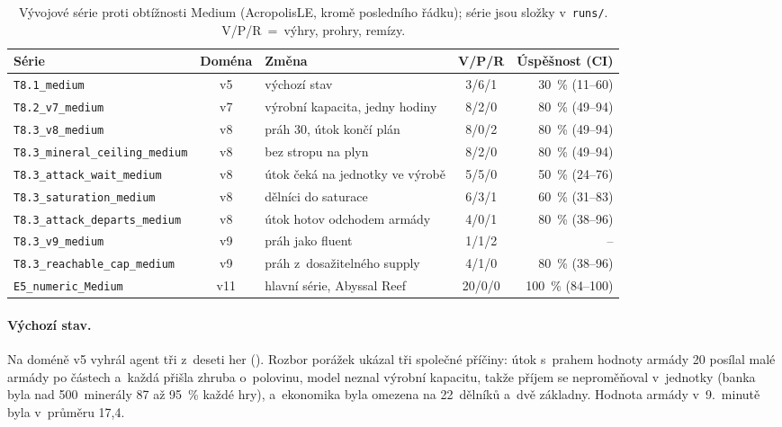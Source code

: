\begin{table}[ht]
	\centering
	\caption[Vývojové série proti obtížnosti Medium.]{Vývojové série proti obtížnosti Medium (AcropolisLE, kromě posledního řádku); série jsou složky v~\texttt{runs/}. V/P/R~=~výhry, prohry, remízy.}
	\label{tab:iterace}
	\footnotesize
	\begin{tabularx}{\textwidth}{@{} >{\raggedright\arraybackslash}p{4.5cm} c >{\raggedright\arraybackslash}X c r @{}}
		\toprule
		\textbf{Série} & \textbf{Doména} & \textbf{Změna} & \textbf{V/P/R} & \textbf{Úspěšnost (CI)} \\
		\midrule
		\nolinkurl{T8.1_medium} & v5 & výchozí stav & 3/6/1 & 30~\% (11--60) \\
		\nolinkurl{T8.2_v7_medium} & v7 & výrobní kapacita, jedny hodiny & 8/2/0 & 80~\% (49--94) \\
		\nolinkurl{T8.3_v8_medium} & v8 & práh 30, útok končí plán & 8/0/2 & 80~\% (49--94) \\
		\nolinkurl{T8.3_mineral_ceiling_medium} & v8 & bez stropu na plyn & 8/2/0 & 80~\% (49--94) \\
		\nolinkurl{T8.3_attack_wait_medium} & v8 & útok čeká na jednotky ve výrobě & 5/5/0 & 50~\% (24--76) \\
		\nolinkurl{T8.3_saturation_medium} & v8 & dělníci do saturace & 6/3/1 & 60~\% (31--83) \\
		\nolinkurl{T8.3_attack_departs_medium} & v8 & útok hotov odchodem armády & 4/0/1 & 80~\% (38--96) \\
		\nolinkurl{T8.3_v9_medium} & v9 & práh jako fluent & 1/1/2 & -- \\
		\nolinkurl{T8.3_reachable_cap_medium} & v9 & práh z~dosažitelného supply & 4/1/0 & 80~\% (38--96) \\
		\addlinespace
		\nolinkurl{E5_numeric_Medium} & v11 & hlavní série, Abyssal Reef & 20/0/0 & 100~\% (84--100) \\
		\bottomrule
	\end{tabularx}
\end{table}

\paragraph{Výchozí stav.} Na doméně v5 vyhrál agent tři z~deseti her (). Rozbor porážek ukázal tři společné příčiny: útok s~prahem hodnoty armády 20 posílal malé armády po částech a~každá přišla zhruba o~polovinu, model neznal výrobní kapacitu, takže příjem se neproměňoval v~jednotky (banka byla nad 500~minerály 87 až 95~\% každé hry), a~ekonomika byla omezena na 22~dělníků a~dvě základny. Hodnota armády v~9.~minutě byla v~průměru 17,4.

